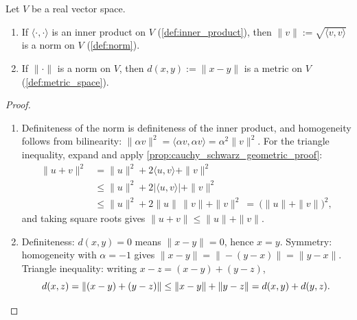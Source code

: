 \begin{proposition}
\label{prop:induced_norm_and_metric}
Let $V$ be a real vector space.
\begin{enumerate}[label=\textbf{(\alph*)}]
  \item If $\langle\cdot,\cdot\rangle$ is an inner product on $V$ (\cref{def:inner_product}),
    then $\|v\| := \sqrt{\langle v,v\rangle}$ is a norm on $V$ (\cref{def:norm}).
  \item If $\|\cdot\|$ is a norm on $V$, then $d(x,y) := \|x-y\|$ is a metric on $V$
    (\cref{def:metric_space}).
\end{enumerate}
\end{proposition}

\begin{proof}
\begin{enumerate}[label=\textbf{(\alph*)}]
  \item Definiteness of the norm is definiteness of the inner product, and homogeneity
    follows from bilinearity: $\|\alpha v\|^2 = \langle\alpha v,\alpha v\rangle =
    \alpha^2\|v\|^2$. For the triangle inequality, expand and apply
    \cref{prop:cauchy_schwarz_geometric_proof}:
    \begin{align*}
      \|u+v\|^2 &= \|u\|^2 + 2\langle u,v\rangle + \|v\|^2 \\
                &\leq \|u\|^2 + 2\lvert\langle u,v\rangle\rvert + \|v\|^2 \\
                &\leq \|u\|^2 + 2\|u\|\,\|v\| + \|v\|^2 \ =\ \big(\|u\|+\|v\|\big)^2,
    \end{align*}
    and taking square roots gives $\|u+v\| \leq \|u\|+\|v\|$.
  \item Definiteness: $d(x,y)=0$ means $\|x-y\|=0$, hence $x=y$. Symmetry: homogeneity
    with $\alpha=-1$ gives $\|x-y\| = \|-(y-x)\| = \|y-x\|$. Triangle inequality: writing
    $x-z = (x-y)+(y-z)$,
    \[d(x,z) = \|(x-y)+(y-z)\| \leq \|x-y\| + \|y-z\| = d(x,y)+d(y,z). \qedhere\]
\end{enumerate}
\end{proof}

